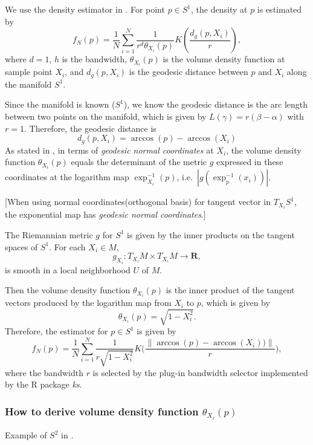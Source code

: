 \documentclass[11pt,a4paper,]{article}
\begin{document}
We use the density estimator in \textcite{Pelletier2005-vu}. For point
\(p \in S^1\), the density at \(p\) is estimated by
\[
f_N(p) = \frac{1}{N} \sum_{i=1}^{N} \frac{1}{r^d \theta_{X_i}(p)} K(\frac{d_g(p, X_i)}{r}),
\] where \(d=1\), \(h\) is the bandwidth,
\(\theta_{X_i}(p)\) is the volume density function at sample point \(X_i\),
and \(d_g(p, X_i)\) is the geodesic distance between \(p\) and \(X_i\) along
the manifold \(S^1\).

Since the manifold is known (\(S^1\)), we know the geodesic distance is
the arc length between two points on the manifold, which is given by
\(L(\gamma) = r(\beta - \alpha)\) with \(r=1\). Therefore, the geodesic
distance is \[
d_g(p, X_i) = \arccos(p) - \arccos(X_i)
\] As stated in \textcite{Pelletier2005-vu}, in terms of \emph{geodesic normal
coordinates} at \(X_i\), the volume density function \(\theta_{X_i}(p)\)
equals the determinant of the metric \(g\) expressed in these coordinates
at the logarithm map \(\exp_{X_i}^{-1}(p)\), i.e.~\(|g(\exp_p^{-1}(x_i))|\).

{[}When using normal coordinates(orthogonal basis) for tangent vector in
\(T_{X_i}S^1\), the exponential map has \emph{geodesic normal coordinates}.{]}

The Riemannian metric \(g\) for \(S^1\) is given by the inner products on
the tangent spaces of \(S^1\). For each \(X_i \in M\), \[
g_{X_i}: T_{X_i}M \times T_{X_i}M \rightarrow \pmb{R},
\] is smooth in a local neighborhood \(U\) of \(M\).

Then the volume density function \(\theta_{X_i}(p)\) is the inner product
of the tangent vectors produced by the logarithm map from \(X_i\) to \(p\),
which is given by \[
\theta_{X_i}(p) = \sqrt{1 - X_i^2}.
\] Therefore, the estimator for \(p \in S^1\) is given by \[
f_N(p) = \frac{1}{N} \sum_{i=1}^{N} \frac{1}{r \sqrt{1 - X_i^2}} K\bigg(\frac{\|\arccos(p) - \arccos(X_i))\|}{r}\bigg),
\] where the bandwidth \(r\) is selected by the plug-in bandwidth selector
implemented by the R package \emph{ks}.

\hypertarget{how-to-derive-volume-density-function-theta_x_ip}{%
\subsubsection{\texorpdfstring{How to derive volume density function \(\theta_{X_i}(p)\)}{How to derive volume density function \textbackslash theta\_\{X\_i\}(p)}}\label{how-to-derive-volume-density-function-theta_x_ip}}

Example of \(S^2\) in \textcite{Henry2009-om}.
\end{document}
